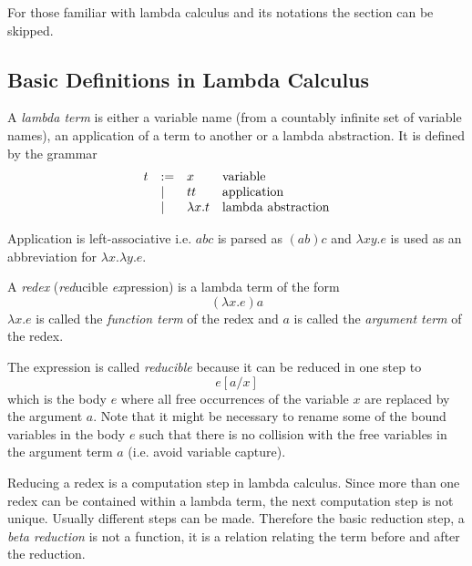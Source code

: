 \documentclass[12pt]{article}
\begin{document}
For those familiar with lambda calculus and its notations the section can be
skipped.





\subsection{Basic Definitions in Lambda Calculus}
\label{sec-basic-lambda-definitions}

\begin{definition}
    A \emph{lambda term}
    is either a variable name (from a countably infinite set of variable names),
    an application of a term to another or a lambda abstraction.  It is defined
    by the grammar
    $$
    \begin{array}{lllll} 
        t &:=& x & \text{variable}
        \\
        &\mid& t t & \text{application}
        \\
        &\mid& \lambda x. t & \text{lambda abstraction}
     \end{array}
    $$
\end{definition}

Application is left-associative i.e. $a b c$ is parsed as $(a b) c$ and $\lambda
x y . e$ is used as an abbreviation for $\lambda x. \lambda y . e$.




\begin{definition}
    A \emph{redex}
    (\emph{red}ucible \emph{ex}pression) is a lambda term of the form
    $$
        (\lambda x . e) a
    $$
    $\lambda x. e$ is called the \emph{function term} of the redex and $a$ is
    called the \emph{argument term} of the redex.

    The expression is called \emph{reducible} because it can be reduced in one
    step to
    $$
        e[a/x]
    $$
    which is the body $e$ where all free occurrences of the variable $x$ are
    replaced by the argument $a$. Note that it might be necessary to rename some
    of the bound variables in the body $e$ such that there is no collision with
    the free variables in the argument term $a$ (i.e. avoid variable capture).
\end{definition}




Reducing a redex is a computation step in lambda calculus. Since more than one
redex can be contained within a lambda term, the next computation step is not
unique. Usually different steps can be made. Therefore the basic reduction step,
a \emph{beta reduction} is not a function, it is a relation relating the term
before and after the reduction.
\end{document}
